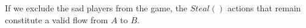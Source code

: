 \begin{proofsketch}
  If we exclude the sad players from the game, the $Steal\left(\right)$ actions that remain constitute a valid flow from
  $A$ to $B$.
\end{proofsketch}
